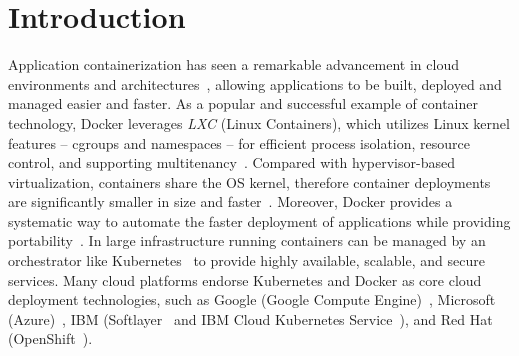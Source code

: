 \section{Introduction}
\label{sec:intro}

%
%
%
%
%
%
%

%
%
Application containerization has seen a remarkable advancement in cloud
environments and architectures~\cite{dockerbook}, allowing applications to be
built, deployed and managed easier and faster.
%
%
%
As a popular and successful example of container technology, Docker leverages
\emph{LXC} (Linux Containers), which utilizes Linux kernel features -- cgroups
and namespaces -- for efficient process isolation, resource control, and
supporting multitenancy~\cite{slacker, 7158965, cntr}.
%
Compared with hypervisor-based virtualization, containers share the OS kernel,
therefore container deployments are significantly smaller in size and
faster~\cite{7819678}.
%
%
Moreover, Docker provides a systematic way to automate the faster deployment of
applications while providing portability~\cite{docker}.
%
In large infrastructure running containers can be managed by an orchestrator
like Kubernetes~\cite{kubernetes} to provide highly available, scalable, and
secure services.
%
%
%
%
Many cloud platforms endorse Kubernetes and Docker as core cloud deployment
technologies, such as Google (Google Compute Engine)~\cite{googlecengine},
Microsoft (Azure)~\cite{azurec}, IBM (Softlayer~\cite{softlayer} and IBM Cloud
Kubernetes Service~\cite{ibmkube}), and Red Hat (OpenShift~\cite{openshift}).




